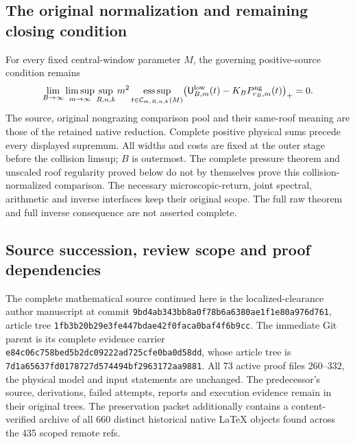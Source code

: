 \documentclass[11pt,reqno]{amsart}
\numberwithin{equation}{section}
\theoremstyle{definition}\newtheorem{definition}[theorem]{Definition}
\theoremstyle{remark}\newtheorem{remark}[theorem]{Remark}
\begin{document}


\subsection*{The original normalization and remaining closing condition}
For every fixed central-window parameter $M$, the governing
positive-source condition remains
\begin{equation}\label{eq:sc-original-obligation}
 \lim_{B\to\infty}\limsup_{m\to\infty}\sup_{R,n,k}
 m^2\operatorname*{ess\,sup}_{t\in\mathcal C_{m,R,n,k}(M)}
 \bigl(\mathsf U^{\rm low}_{B,m}(t)
                    -K_BP^{\rm ng}_{r_B,m}(t)\bigr)_+=0.
\end{equation}
The source, original nongrazing comparison pool and their same-roof
meaning are those of the retained native reduction. Complete positive
physical sums precede every displayed supremum. All widths and costs
are fixed at the outer stage before the collision limsup; $B$ is
outermost. The complete pressure theorem and unscaled roof regularity
proved below do not by themselves prove this collision-normalized
comparison. The necessary microscopic-return, joint spectral,
arithmetic and inverse interfaces keep their original scope. The
full raw theorem and full inverse consequence are not asserted complete.

\subsection*{Source succession, review scope and proof dependencies}
The complete mathematical source continued here is the localized-clearance
author manuscript at commit
\texttt{9bd4ab34\allowbreak{}3bb8a0f7\allowbreak{}8b6a6380\allowbreak{}ae1f1e80\allowbreak{}a976d761},
article tree
\texttt{1fb3b20b\allowbreak{}29e3fe44\allowbreak{}7bdae42f\allowbreak{}0faca0ba\allowbreak{}f4f6b9cc}.
The immediate Git parent is its complete evidence carrier
\texttt{e84c06c7\allowbreak{}58bed5b2\allowbreak{}dc09222a\allowbreak{}d725cfe0\allowbreak{}ba0d58dd},
whose article tree is
\texttt{7d1a6563\allowbreak{}7fd01787\allowbreak{}27d57449\allowbreak{}4bf29631\allowbreak{}72aa9881}.
All 73 active proof files 260--332, the physical model and input
statements are unchanged. The predecessor's source, derivations,
failed attempts, reports and execution evidence remain in their
original trees. The preservation packet additionally contains a
content-verified archive of all 660 distinct historical native
LaTeX objects found across the 435 scoped remote refs.
\end{document}
